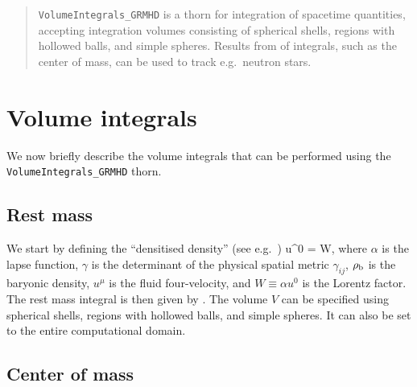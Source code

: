 \newenvironment{packed_enumerate}{
\begin{enumerate}
  \setlength{\itemsep}{0.0pt}
  \setlength{\parskip}{0.0pt}
  \setlength{\parsep}{ 0.0pt}
}{\end{enumerate}}

\begin{abstract}
  \texttt{VolumeIntegrals\_GRMHD} is a thorn for integration of
  spacetime quantities, accepting integration volumes consisting of
  spherical shells, regions with hollowed balls, and simple spheres.
  Results from of integrals, such as the center of mass, can be used
  to track e.g.\ neutron stars.
\end{abstract}

\section{Volume integrals}
\label{sec:volume_integrals}

We now briefly describe the volume integrals that can be performed
using the \texttt{VolumeIntegrals\_GRMHD} thorn.


\subsection{Rest mass}
\label{sec:rest_mass}
We start by defining the ``densitised density'' (see e.g.~\cite{duez2005relativistic})
\beq
\rhostar \equiv \alpha\sqrt{\gamma}\rhob u^{0} = W\rhob\sqrt{\gamma},
\eeq
where $\alpha$ is the lapse function, $\gamma$ is the determinant of
the physical spatial metric $\gamma_{ij}$, $\rho_{\rm b}$ is the baryonic
density, $u^{\mu}$ is the fluid four-velocity, and $W\equiv\alpha u^{0}$
is the Lorentz factor. The rest mass integral is then given by
\beq
{}\; .
\eeq
The volume $V$ can be specified using spherical shells, regions with hollowed balls,
and simple spheres. It can also be set to the entire computational domain.

\subsection{Center of mass}
\label{sec:com}

